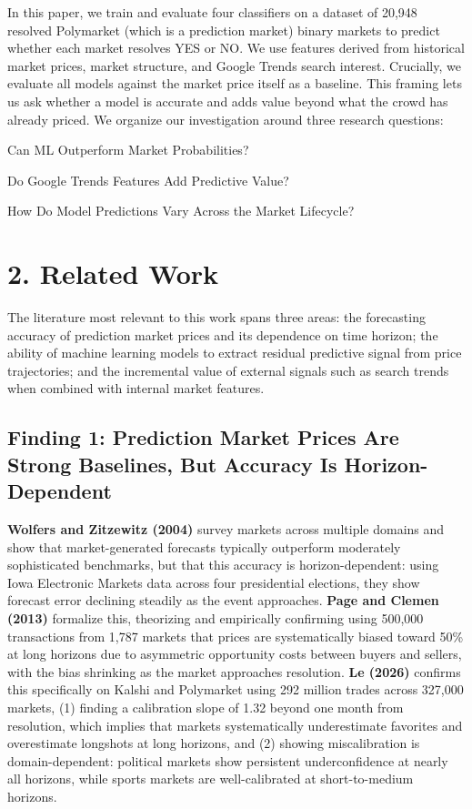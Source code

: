 \documentclass[11pt,twocolumn]{article}
\begin{document}
In this paper, we train and evaluate four classifiers on a dataset of 20,948 resolved Polymarket (which is a prediction market) binary markets to predict whether each market resolves YES or NO. We use features derived from historical market prices, market structure, and Google Trends search interest. Crucially, we evaluate all models against the market price itself as a baseline. This framing lets us ask whether a model is accurate and adds value beyond what the crowd has already priced. We organize our investigation around three research questions:
\begin{description}[noitemsep, topsep=2pt]
    \item[\textbf{RQ1:}] Can ML Outperform Market Probabilities?
    \item[\textbf{RQ2:}] Do Google Trends Features Add Predictive Value?
    \item[\textbf{RQ3:}] How Do Model Predictions Vary Across the Market Lifecycle?
\end{description}

\section*{2. Related Work}

The literature most relevant to this work spans three areas: the forecasting accuracy of prediction market prices and its dependence on time horizon; the ability of machine learning models to extract residual predictive signal from price trajectories; and the incremental value of external signals such as search trends when combined with internal market features.

\subsection*{Finding 1: Prediction Market Prices Are Strong Baselines, But Accuracy Is Horizon-Dependent}

\textbf{Wolfers and Zitzewitz (2004)} survey markets across multiple domains and show that market-generated forecasts typically outperform moderately sophisticated benchmarks, but that this accuracy is horizon-dependent: using Iowa Electronic Markets data across four presidential elections, they show forecast error declining steadily as the event approaches. \textbf{Page and Clemen (2013)} formalize this, theorizing and empirically confirming using 500,000 transactions from 1,787 markets that prices are systematically biased toward 50\% at long horizons due to asymmetric opportunity costs between buyers and sellers, with the bias shrinking as the market approaches resolution. \textbf{Le (2026)} confirms this specifically on Kalshi and Polymarket using 292 million trades across 327,000 markets, (1) finding a calibration slope of 1.32 beyond one month from resolution, which implies that markets systematically underestimate favorites and overestimate longshots at long horizons, and (2) showing miscalibration is domain-dependent: political markets show persistent underconfidence at nearly all horizons, while sports markets are well-calibrated at short-to-medium horizons.
\end{document}

